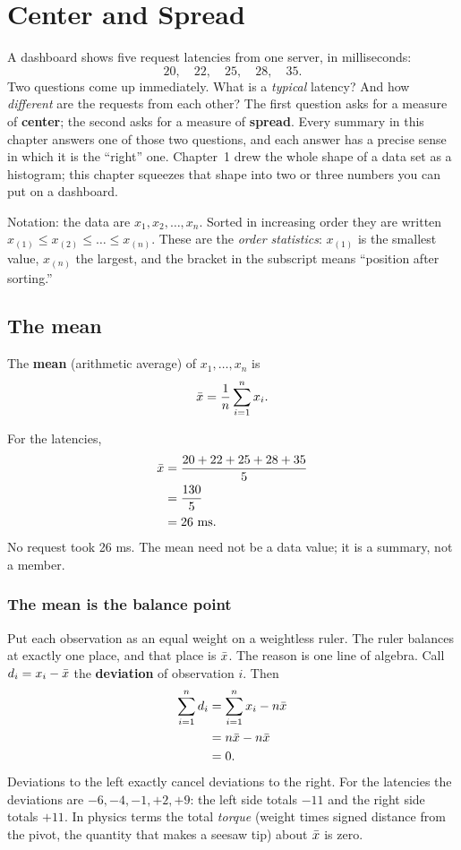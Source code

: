 \chapter{Center and Spread}
\label{ch:center-spread}

A dashboard shows five request latencies from one server, in milliseconds:
\[
  20,\quad 22,\quad 25,\quad 28,\quad 35.
\]
Two questions come up immediately. What is a \emph{typical} latency? And how
\emph{different} are the requests from each other? The first question asks for a
measure of \textbf{center}; the second asks for a measure of \textbf{spread}. Every
summary in this chapter answers one of those two questions, and each answer has a
precise sense in which it is the ``right'' one. Chapter~1 drew the whole shape of a
data set as a histogram; this chapter squeezes that shape into two or three numbers
you can put on a dashboard.

Notation: the data are $x_1, x_2, \dots, x_n$. Sorted in increasing order they are
written $x_{(1)} \le x_{(2)} \le \dots \le x_{(n)}$. These are the \emph{order
statistics}: $x_{(1)}$ is the smallest value, $x_{(n)}$ the largest, and the bracket
in the subscript means ``position after sorting.''

\section{The mean}
\label{sec:center-spread-mean}

\begin{definition}
The \textbf{mean} (arithmetic average) of $x_1,\dots,x_n$ is
\[
  \bar{x} = \frac{1}{n}\sum_{i=1}^n x_i .
\]
\end{definition}

For the latencies,
\begin{align*}
  \bar{x} &= \frac{20+22+25+28+35}{5} \\
        &= \frac{130}{5} \\
        &= 26 \text{ ms}.
\end{align*}
No request took 26 ms. The mean need not be a data value; it is a
summary, not a member.

\subsection{The mean is the balance point}

Put each observation as an equal weight on a weightless ruler. The ruler balances
at exactly one place, and that place is $\bar{x}$. The reason is one line of algebra.
Call $d_i = x_i - \bar{x}$ the \textbf{deviation} of observation $i$. Then
\begin{align*}
  \sum_{i=1}^n d_i &= \sum_{i=1}^n x_i - n\bar{x} \\
                   &= n\bar{x} - n\bar{x} \\
                   &= 0.
\end{align*}
Deviations to the left exactly cancel deviations to the right. For the latencies
the deviations are $-6,-4,-1,+2,+9$: the left side totals $-11$ and the right side
totals $+11$. In physics terms the total \emph{torque} (weight times signed distance
from the pivot, the quantity that makes a seesaw tip) about $\bar{x}$ is zero.

